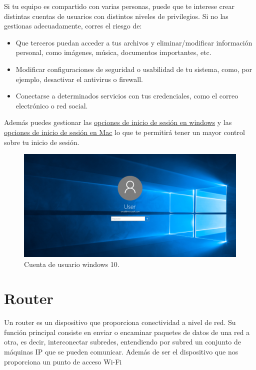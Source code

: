 \documentclass[
  spanish,
  a4paper,
  openany]{book}
\begin{document}
Si tu equipo es compartido con varias personas, puede que te interese crear distintas cuentas de usuarios con distintos niveles de privilegios. Si no las gestionas
adecuadamente, corres el riesgo de:

\begin{itemize}
\item
  Que terceros puedan acceder a tus archivos y eliminar/modificar información personal, como imágenes, música, documentos importantes, etc.
\item
  Modificar configuraciones de seguridad o usabilidad de tu sistema, como, por ejemplo, desactivar el antivirus o firewall.
\item
  Conectarse a determinados servicios con tus credenciales, como el correo electrónico o red social.
\end{itemize}

Además puedes gestionar las \href{https://support.microsoft.com/es-es/windows/las-opciones-de-inicio-de-sesi\%C3\%B3n-de-windows-10-y-la-protecci\%C3\%B3n-de-la-cuenta-7b34d4cf-794f-f6bd-ddcc-e73cdf1a6fbf}{opciones de inicio de sesión en windows} y las \href{https://support.apple.com/es-es/guide/mac-help/mtusr005/mac}{opciones de inicio de sesión en Mac} lo que te permitirá tener un mayor control sobre tu inicio de sesión.

\begin{figure}

{\centering \includegraphics[width=0.75\linewidth]{images/cuenta-usuario-windows-10} 

}

\caption{Cuenta de usuario windows 10.}\label{fig:unnamed-chunk-9}
\end{figure}

\hypertarget{router}{%
\section{Router}\label{router}}

Un router es un dispositivo que proporciona conectividad a nivel de red. Su función principal consiste en enviar o encaminar paquetes de datos de una red a otra, es decir, interconectar subredes, entendiendo por subred un conjunto de máquinas IP que se pueden comunicar. Además de ser el dispositivo que nos proporciona un punto de acceso Wi-Fi
\end{document}
